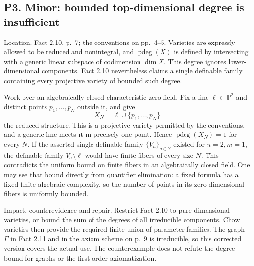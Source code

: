 \documentclass[10pt]{article}
\begin{document}
\subsection*{P3. Minor: bounded top-dimensional degree is insufficient}
Location. Fact 2.10, p. 7; the conventions on pp. 4–5. Varieties are expressly allowed to be reduced and nonintegral, and \(\operatorname{pdeg}(X)\) is defined by intersecting with a generic linear subspace of codimension \(\dim X\). This degree ignores lower-dimensional components. Fact 2.10 nevertheless claims a single definable family containing every projective variety of bounded such degree.\par
Work over an algebraically closed characteristic-zero field. Fix a line \(\ell\subset\mathbb P^2\) and distinct points \(p_1,\ldots,p_N\) outside it, and give \[X_N=\ell\cup\{p_1,\ldots,p_N\}\] the reduced structure. This is a projective variety permitted by the conventions, and a generic line meets it in precisely one point. Hence \(\operatorname{pdeg}(X_N)=1\) for every \(N\). If the asserted single definable family \(\{V_a\}_{a\in Y}\) existed for \(n=2,m=1\), the definable family \(V_a\setminus\ell\) would have finite fibers of every size \(N\). This contradicts the uniform bound on finite fibers in an algebraically closed field. One may see that bound directly from quantifier elimination: a fixed formula has a fixed finite algebraic complexity, so the number of points in its zero-dimensional fibers is uniformly bounded.\par
Impact, counterevidence and repair. Restrict Fact 2.10 to pure-dimensional varieties, or bound the sum of the degrees of all irreducible components. Chow varieties then provide the required finite union of parameter families. The graph \(\Gamma\) in Fact 2.11 and in the axiom scheme on p. 9 is irreducible, so this corrected version covers the actual use. The counterexample does not refute the degree bound for graphs or the first-order axiomatization.\par
\end{document}
